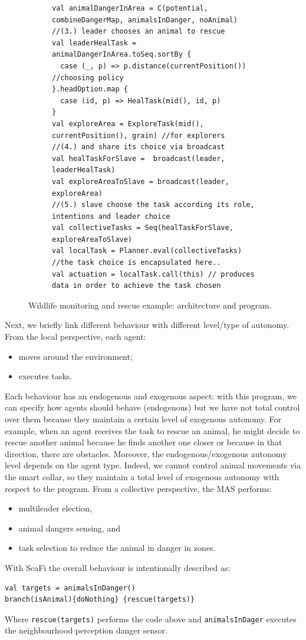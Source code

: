\begin{figure}[t!]
\begin{subfigure}[b]{\textwidth}
\begin{lstlisting}
val animalDangerInArea = C(potential, combineDangerMap, animalsInDanger, noAnimal)
//(3.) leader chooses an animal to rescue
val leaderHealTask = animalDangerInArea.toSeq.sortBy {
  case (_, p) => p.distance(currentPosition()) //choosing policy
}.headOption.map {
  case (id, p) => HealTask(mid(), id, p)
}
val exploreArea = ExploreTask(mid(), currentPosition(), grain) //for explorers
//(4.) and share its choice via broadcast
val healTaskForSlave =  broadcast(leader, leaderHealTask)
val exploreAreaToSlave = broadcast(leader, exploreArea)
//(5.) slave choose the task according its role, intentions and leader choice
val collectiveTasks = Seq(healTaskForSlave, exploreAreaToSlave)
val localTask = Planner.eval(collectiveTasks) //the task choice is encapsulated here..
val actuation = localTask.call(this) // produces data in order to achieve the task chosen 
\end{lstlisting}
\caption{}
\label{fig:wildlife-code}
\end{subfigure}
%
\caption{Wildlife monitoring and rescue example: architecture and program.}
\label{fig:wildlife-example}
\end{figure}
%
Next, we briefly link different 
 behaviour with different level/type of autonomy. 
%
From the local perspective, each agent:
\begin{itemize}
\item moves around the environment;
\item executes tasks.
\end{itemize}
%
Each behaviour has an endogenous and exogenous aspect: with this program, 
 we can specify how agents should behave (endogenous) but we have not total 
 control over them because they maintain a certain level of exogenous autonomy. 
%
For example, when an agent receives the task to rescue an animal, 
 he might decide to rescue another animal because he finds another one closer or
 because in that direction, there are obstacles. 
%
Moreover, the endogenous/exogenous autonomy level depends on the agent type. 
 Indeed, we cannot control animal movements via the smart collar, 
 so they maintain a total level of exogenous autonomy with respect to the program.
%
From a collective perspective, the MAS performs: 
\begin{itemize}
\item multileader election,
\item animal dangers sensing, and
\item task selection to reduce the animal in danger in zones.
\end{itemize}
%
With ScaFi the overall behaviour is intentionally described as:
\begin{lstlisting}
val targets = animalsInDanger()
branch(isAnimal){doNothing} {rescue(targets)}
\end{lstlisting}
Where \lstinline|rescue(targets)| performs the code above and \lstinline|animalsInDager|
  executes the neighbourhood perception danger sensor.

